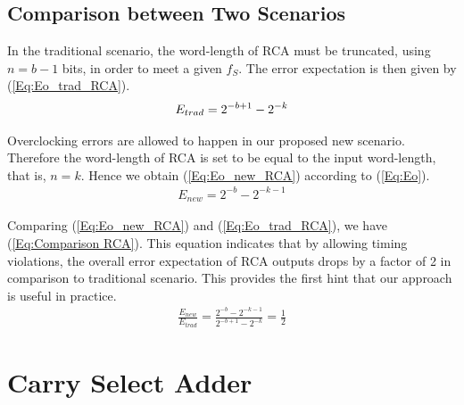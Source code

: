 \documentclass[prodmode,acmtrets]{acmsmall} %
\begin{document}
\subsection{Comparison between Two Scenarios}\label{section_RCA_Comparison}
In the traditional scenario, the word-length of RCA must be truncated, using $n=b-1$ bits, in order to meet a given $f_S$. The error expectation is then given by (\ref{Eq:Eo_trad_RCA}).
%
\begin{eqnarray}\label{Eq:Eo_trad_RCA}
  E_{trad}=2^{-b+1}-2^{-k}
  \vspace{-1ex}
\end{eqnarray}

Overclocking errors are allowed to happen in our proposed new scenario. Therefore the word-length of RCA is set to be equal to the input word-length, that is, $n=k$. Hence we obtain (\ref{Eq:Eo_new_RCA}) according to (\ref{Eq:Eo}).
%
\begin{eqnarray}\label{Eq:Eo_new_RCA}
  E_{new}=2^{-b}-2^{-k-1}
\end{eqnarray}

Comparing (\ref{Eq:Eo_new_RCA}) and (\ref{Eq:Eo_trad_RCA}), we have (\ref{Eq:Comparison RCA}). This equation indicates that by allowing timing violations, the overall error expectation of RCA outputs drops by a factor of 2 in comparison to traditional scenario. This provides the first hint that our approach is useful in practice.
%
\begin{eqnarray}\label{Eq:Comparison RCA}
  \frac{E_{new}}{E_{trad}}=\frac{2^{-b}-2^{-k-1}}{2^{-b+1}-2^{-k}}=\frac{1}{2}
\end{eqnarray}

\section{Carry Select Adder}\label{Section_CSA}
\end{document}
